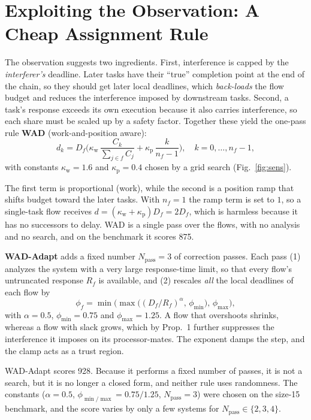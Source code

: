 \documentclass[conference]{IEEEtran}
\begin{document}
\section{Exploiting the Observation: A Cheap Assignment Rule}
\label{sec:rule}

The observation suggests two ingredients. First, interference is capped by the
\emph{interferer's} deadline. Later tasks have their ``true'' completion point at
the end of the chain, so they should get later local deadlines, which
\emph{back-loads} the flow budget and reduces the interference imposed by
downstream tasks. Second, a task's response exceeds its own execution because it
also carries interference, so each share must be scaled up by a safety factor.
Together these yield the one-pass rule \textbf{WAD} (work-and-position aware):
\begin{equation}
d_k = D_f\Big( \kappa_{\mathrm{w}}\,\frac{C_k}{\sum_{j\in f} C_j}
      + \kappa_{\mathrm{p}}\,\frac{k}{n_f-1} \Big),\quad k=0,\dots,n_f{-}1,
\label{eq:wad}
\end{equation}
with constants $\kappa_{\mathrm{w}}=1.6$ and $\kappa_{\mathrm{p}}=0.4$ chosen by a
grid search (Fig.~\ref{fig:sens}).

The first term is proportional (work), while the second is a position ramp that
shifts budget toward the later tasks. With $n_f=1$ the ramp term is set to $1$, so
a single-task flow receives
$d=(\kappa_{\mathrm{w}}{+}\kappa_{\mathrm{p}})D_f=2D_f$, which is harmless
because it has no successors to delay. WAD is a single pass over the flows, with
no analysis and no search, and on the benchmark it scores 875.

\textbf{WAD-Adapt} adds a fixed number $N_{\mathrm{pass}}=3$ of correction passes.
Each pass (1) analyzes the system with a very large response-time limit, so that
every flow's untruncated response $R_f$ is available, and (2) rescales \emph{all}
the local deadlines of each flow by
\begin{equation}
\phi_f = \min\!\Big(\max\!\big((D_f/R_f)^{\alpha},\,\phi_{\min}\big),\,
\phi_{\max}\Big),
\label{eq:adapt}
\end{equation}
with $\alpha=0.5$, $\phi_{\min}=0.75$ and $\phi_{\max}=1.25$. A flow that
overshoots shrinks, whereas a flow with slack grows, which by Prop.~1 further
suppresses the interference it imposes on its processor-mates. The exponent damps
the step, and the clamp acts as a trust region.

WAD-Adapt scores 928. Because it performs a fixed number of passes, it is not a
search, but it is no longer a closed form, and neither rule uses randomness. The
constants ($\alpha=0.5$, $\phi_{\min/\max}=0.75/1.25$, $N_{\mathrm{pass}}=3$) were
chosen on the size-15 benchmark, and the score varies by only a few systems for
$N_{\mathrm{pass}}\in\{2,3,4\}$.
\end{document}
